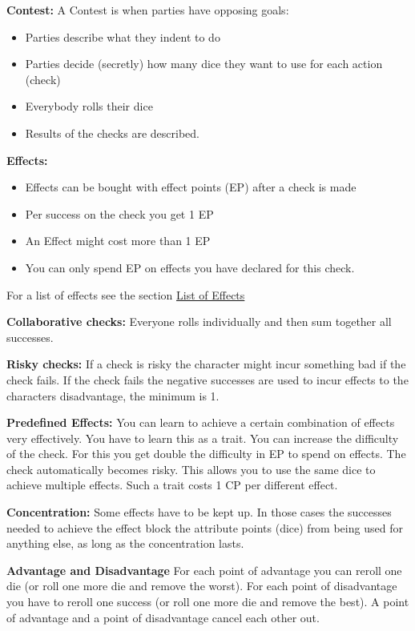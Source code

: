 \documentclass[11pt]{article}
\begin{document}
{\begin{multicols}{2}[]
\textbf{Contest:}
A Contest is when parties have opposing goals:
\begin{itemize}
\item Parties describe what they indent to do
\item Parties decide (secretly) how many dice they want to use for each action (check)
\item Everybody rolls their dice
\item Results of the checks are described.
\end{itemize}

\textbf{Effects:}
\begin{itemize}
\item Effects can be bought with effect points (EP) after a check is made
\item Per success on the check you get 1 EP
\item An Effect might cost more than 1 EP
\item You can only spend EP on effects you have declared for this check.
\end{itemize}
For a list of effects see the section \hyperref[sec:org81489f8]{List of Effects}

\textbf{Collaborative checks:}
Everyone rolls individually and then sum together all successes.

\textbf{Risky checks:}
If a check is risky the character might incur something bad if the check fails. If the check fails the negative successes are used to incur effects to the characters disadvantage, the minimum is 1. 

\textbf{Predefined Effects:}
You can learn to achieve a certain combination of effects very effectively. You have to learn this as a trait. You can increase the difficulty of the check. For this you get double the difficulty in EP to spend on effects. The check automatically becomes risky. This allows you to use the same dice to achieve multiple effects. Such a trait costs 1 CP per different effect.

\textbf{Concentration:}
Some effects have to be kept up. In those cases the successes needed to achieve the effect block the attribute points (dice) from being used for anything else, as long as the concentration lasts. 

\textbf{Advantage and Disadvantage} 
For each point of advantage you can reroll one die (or roll one more die and remove the worst). For each point of disadvantage you have to reroll one success (or roll one more die and remove the best). A point of advantage and a point of disadvantage cancel each other out.


\end{multicols}}
\end{document}
